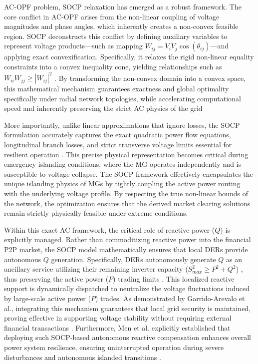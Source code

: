 AC-OPF problem, SOCP relaxation has emerged as a robust framework. The core conflict in AC-OPF arises from the non-linear coupling of voltage magnitudes and phase angles, which inherently creates a non-convex feasible region. SOCP deconstructs this conflict by defining auxiliary variables to represent voltage products---such as mapping $W_{ij} = V_{i} V_{j} \cos(\theta_{ij})$---and applying exact convexification. Specifically, it relaxes the rigid non-linear equality constraints into a convex inequality cone, yielding relationships such as $W_{ii} W_{jj} \geq |W_{ij}|^2$ \cite{farivar2013branch, Patari2021}. By transforming the non-convex domain into a convex space, this mathematical mechanism guarantees exactness and global optimality specifically under radial network topologies, while accelerating computational speed and inherently preserving the strict AC physics of the grid \cite{Low2014_SOCP}

More importantly, unlike linear approximations that ignore losses, the SOCP formulation accurately captures the exact quadratic power flow equations, longitudinal branch losses, and strict transverse voltage limits essential for resilient operation \cite{Low2014_SOCP, Srivastava2023}. This precise physical representation becomes critical during emergency islanding conditions, where the MG operates independently and is susceptible to voltage collapse. The SOCP framework effectively encapsulates the unique islanding physics of MGs by tightly coupling the active power routing with the underlying voltage profile. By respecting the true non-linear bounds of the network, the optimization ensures that the derived market clearing solutions remain strictly physically feasible under extreme conditions.

Within this exact AC framework, the critical role of reactive power ($Q$) is explicitly managed. Rather than commoditizing reactive power into the financial P2P market, the SOCP model mathematically ensures that local DERs provide autonomous $Q$ generation. Specifically, DERs autonomously generate $Q$ as an ancillary service utilizing their remaining inverter capacity ($S_{max}^2 \ge P^2 + Q^2$) \cite{Montoya2021Mixed}, thus preserving the active power ($P$) trading limits \cite{Angle2020SOCP}. This localized reactive support is dynamically dispatched to neutralize the voltage fluctuations induced by large-scale active power ($P$) trades. As demonstrated by Garrido-Arevalo et al., integrating this mechanism guarantees that local grid security is maintained, proving effective in supporting voltage stability without requiring external financial transactions \cite{Garrido_Arevalo_2024}. Furthermore, Men et al. explicitly established that deploying such SOCP-based autonomous reactive compensation enhances overall power system resilience, ensuring uninterrupted operation during severe disturbances and autonomous islanded transitions \cite{men2023secondary}.

